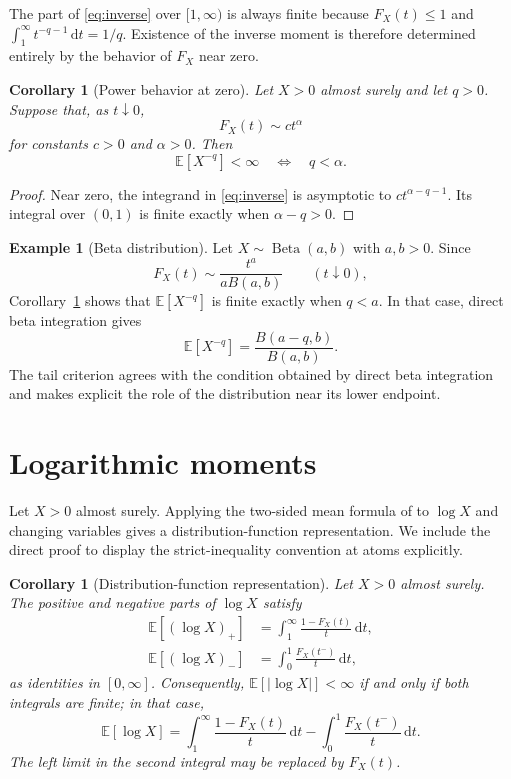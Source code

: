 \documentclass[11pt]{article}
\newtheorem{corollary}[theorem]{Corollary}
\theoremstyle{definition}
\newtheorem{example}[theorem]{Example}
\theoremstyle{remark}
\newcommand{\E}{\mathbb{E}}
\newcommand{\dd}{\,\mathrm{d}}
\newcommand{\abs}[1]{\left\lvert #1\right\rvert}
\begin{document}
The part of \eqref{eq:inverse} over $[1,\infty)$ is always finite because
$F_X(t)\leq1$ and $\int_1^\infty t^{-q-1}\dd t=1/q$.  Existence of the
inverse moment is therefore determined entirely by the behavior of $F_X$
near zero.

\begin{corollary}[Power behavior at zero]\label{cor:near-zero}
Let $X>0$ almost surely and let $q>0$.  Suppose that, as $t\downarrow0$,
\[
  F_X(t)\sim c t^\alpha
\]
for constants $c>0$ and $\alpha>0$.  Then
\[
  \E[X^{-q}]<\infty
  \quad\Longleftrightarrow\quad q<\alpha.
\]
\end{corollary}

\begin{proof}
Near zero, the integrand in \eqref{eq:inverse} is asymptotic to
$c t^{\alpha-q-1}$.  Its integral over $(0,1)$ is finite exactly when
$\alpha-q>0$.
\end{proof}

\begin{example}[Beta distribution]\label{ex:beta}
Let $X\sim\operatorname{Beta}(a,b)$ with $a,b>0$.  Since
\[
  F_X(t)\sim\frac{t^a}{aB(a,b)}
  \qquad(t\downarrow0),
\]
Corollary~\ref{cor:near-zero} shows that $\E[X^{-q}]$ is finite exactly
when $q<a$.  In that case, direct beta integration gives
\[
  \E[X^{-q}]
  =\frac{B(a-q,b)}{B(a,b)}.
\]
The tail criterion agrees with the condition obtained by direct beta
integration and makes explicit the role of the distribution near its lower
endpoint.
\end{example}

\section{Logarithmic moments}
\label{sec:logarithmic}

Let $X>0$ almost surely.  Applying the two-sided mean formula of
\citet[Proposition~2.1]{Lo2019} to $\log X$ and changing variables gives a
distribution-function representation.  We include the direct proof to
display the strict-inequality convention at atoms explicitly.

\begin{corollary}[Distribution-function representation]\label{cor:log-cdf}
Let $X>0$ almost surely.  The positive and negative parts of $\log X$ satisfy
\begin{align}
  \E[(\log X)_+]
  &=\int_1^\infty\frac{1-F_X(t)}{t}\dd t,
  \label{eq:log-positive}\\
  \E[(\log X)_-]
  &=\int_0^1\frac{F_X(t^-)}{t}\dd t,
  \label{eq:log-negative}
\end{align}
as identities in $[0,\infty]$.  Consequently,
$\E[\abs{\log X}]<\infty$ if and only if both integrals are finite; in that
case,
\begin{equation}\label{eq:log-cdf}
  \E[\log X]
  =\int_1^\infty\frac{1-F_X(t)}{t}\dd t
   -\int_0^1\frac{F_X(t^-)}{t}\dd t.
\end{equation}
The left limit in the second integral may be replaced by $F_X(t)$.
\end{corollary}
\end{document}
